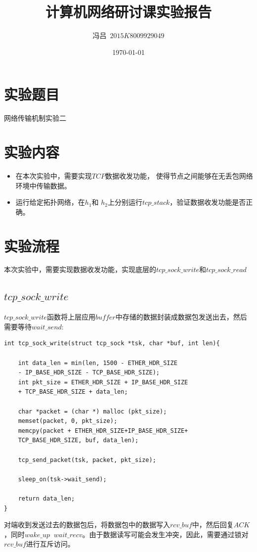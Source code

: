 \documentclass[UTF8,noindent]{ctexart}
\title{\CJKfamily{zhkai}计算机网络研讨课实验报告}
\author{{\CJKfamily{zhkai}冯吕}\ $2015K8009929049$}
\date{\today}
\begin{document}
\maketitle
{}
\section{{实验题目}}网络传输机制实验二
\section{{实验内容}}
\begin{itemize}
  \item 在本次实验中，需要实现$TCP$数据收发功能， 使得节点之间能够在无丢包网络环境中传输数据。
	\item 运行给定拓扑网络，在$h_1$和 $h_2$上分别运行$tcp\_stack$，验证数据收发功能是否正确。
\end{itemize}
\section{{实验流程}}
本次实验中，需要实现数据收发功能，实现底层的$tcp\_sock\_write$和$tcp\_sock\_read$
\subsection{$tcp\_sock\_write$}
$tcp\_sock\_write$函数将上层应用$buffer$中存储的数据封装成数据包发送出去，然后需要等待$wait\_send$:

\begin{lstlisting}
int tcp_sock_write(struct tcp_sock *tsk, char *buf, int len){

	int data_len = min(len, 1500 - ETHER_HDR_SIZE
	- IP_BASE_HDR_SIZE - TCP_BASE_HDR_SIZE);
	int pkt_size = ETHER_HDR_SIZE + IP_BASE_HDR_SIZE
	+ TCP_BASE_HDR_SIZE + data_len;

	char *packet = (char *) malloc (pkt_size);
	memset(packet, 0, pkt_size);
	memcpy(packet + ETHER_HDR_SIZE+IP_BASE_HDR_SIZE+
	TCP_BASE_HDR_SIZE, buf, data_len);

	tcp_send_packet(tsk, packet, pkt_size);

	sleep_on(tsk->wait_send);

	return data_len;
}
\end{lstlisting}

对端收到发送过去的数据包后，将数据包中的数据写入$rcv\_buf$中，然后回复$ACK$，同时$wake\_up$ $\ wait\_recv$。由于数据读写可能会发生冲突，因此，需要通过锁对$rcv\_buf$进行互斥访问。
\end{document}
